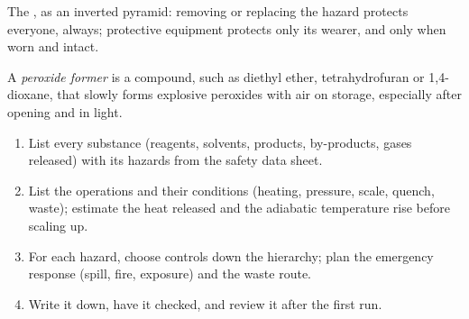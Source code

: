 \begin{omfigure}

{\small The , as an inverted pyramid: removing or replacing
the hazard protects everyone, always; protective equipment protects only its
wearer, and only when worn and intact.}
\end{omfigure}

\begin{definition}\label{def:b3:lab-techniques-3:peroxide}
A \emph{peroxide former} is a compound, such as diethyl
ether, tetrahydrofuran or 1,4-dioxane, that slowly forms explosive peroxides
with air on storage, especially after opening and in light.
\end{definition}

\begin{method}\label{met:b3:lab-techniques-3:risk-assessment}
\begin{enumerate}
  \item List every substance (reagents, solvents, products, by-products, gases
        released) with its hazards from the safety data sheet.
  \item List the operations and their conditions (heating, pressure, scale,
        quench, waste); estimate the heat released and the adiabatic temperature rise
        before scaling up.
  \item For each hazard, choose controls down the hierarchy; plan the emergency
        response (spill, fire, exposure) and the waste route.
  \item Write it down, have it checked, and review it after the first run.
\end{enumerate}
\end{method}

